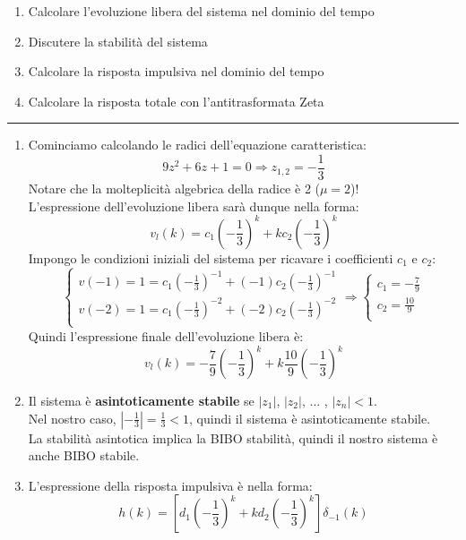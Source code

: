 \documentclass[12pt,a4paper]{article}
\begin{document}
	\begin{enumerate}
		\item Calcolare l'evoluzione libera del sistema nel dominio del tempo
		\item Discutere la stabilit\`a del sistema
		\item Calcolare la risposta impulsiva nel dominio del tempo
		\item Calcolare la risposta totale con l'antitrasformata Zeta

	\end{enumerate}
	\par\noindent\rule{\textwidth}{0.4pt}
	\begin{enumerate}
		\item Cominciamo calcolando le radici dell'equazione caratteristica:
		\[
			9z^2 + 6z + 1 = 0
			\Rightarrow
			z_{1,2} = -\frac{1}{3}
		\]
		Notare che la molteplicit\`a algebrica della radice è 2 ($\mu = 2$)! \\
		L'espressione dell'evoluzione libera sar\`a dunque nella forma:
		\[
			v_l(k) = c_1\left(-\frac{1}{3}\right)^k + kc_2\left(-\frac{1}{3}\right)^k
		\]
		Impongo le condizioni iniziali del sistema per ricavare i coefficienti $c_1$ e $c_2$:
		\[
			\begin{cases}
				v(-1) = 1 = c_1\left(-\frac{1}{3}\right)^{-1} + (-1)c_2\left(-\frac{1}{3}\right)^{-1} \\
				v(-2) = 1 = c_1\left(-\frac{1}{3}\right)^{-2} + (-2)c_2\left(-\frac{1}{3}\right)^{-2} \\
			\end{cases}
			\Rightarrow
			\begin{cases}
				c_1 = -\frac{7}{9}\\
				c_2 = \frac{10}{9}\\
			\end{cases}
		\]
		Quindi l'espressione finale dell'evoluzione libera \`e:
		\[
			v_l(k) = -\frac{7}{9}\left(-\frac{1}{3}\right)^k + k\frac{10}{9}\left(-\frac{1}{3}\right)^k
		\]
		\item Il sistema è \textbf{asintoticamente stabile} se $|z_1|$, $|z_2|$, ... , $|z_n| < 1$. \\
		Nel nostro caso, $|-\frac{1}{3}| = \frac{1}{3} < 1$, quindi il sistema è asintoticamente stabile.\\
		La stabilit\`a asintotica implica la BIBO stabilit\`a, quindi il nostro sistema \`e anche BIBO stabile.
		\item L'espressione della risposta impulsiva \`e nella forma:
		\[
			h(k) = \left[d_1\left(-\frac{1}{3}\right)^k + kd_2\left(-\frac{1}{3}\right)^k\right]\delta_{-1}(k)
\]
\end{enumerate}
\end{document}
